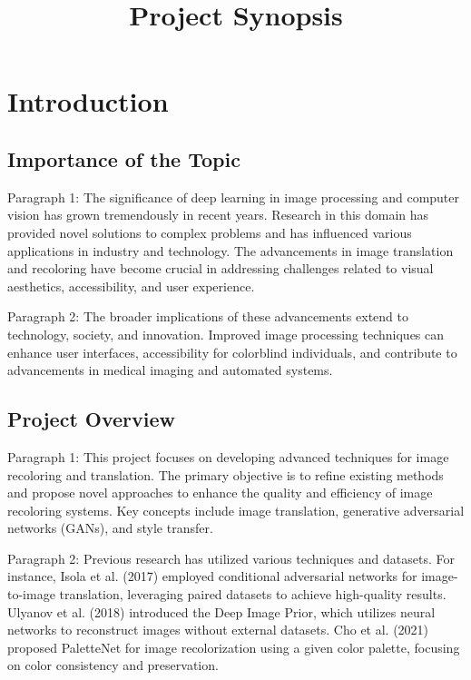 \documentclass{article}
\title{Project Synopsis}
\author{}
\date{}
\begin{document}
\maketitle

\section{Introduction}

\subsection{Importance of the Topic}

Paragraph 1: The significance of deep learning in image processing and computer vision has grown tremendously in recent years. Research in this domain has provided novel solutions to complex problems and has influenced various applications in industry and technology. The advancements in image translation and recoloring have become crucial in addressing challenges related to visual aesthetics, accessibility, and user experience.

Paragraph 2: The broader implications of these advancements extend to technology, society, and innovation. Improved image processing techniques can enhance user interfaces, accessibility for colorblind individuals, and contribute to advancements in medical imaging and automated systems.

\subsection{Project Overview}

Paragraph 1: This project focuses on developing advanced techniques for image recoloring and translation. The primary objective is to refine existing methods and propose novel approaches to enhance the quality and efficiency of image recoloring systems. Key concepts include image translation, generative adversarial networks (GANs), and style transfer.

Paragraph 2: Previous research has utilized various techniques and datasets. For instance, Isola et al. (2017) employed conditional adversarial networks for image-to-image translation, leveraging paired datasets to achieve high-quality results. Ulyanov et al. (2018) introduced the Deep Image Prior, which utilizes neural networks to reconstruct images without external datasets. Cho et al. (2021) proposed PaletteNet for image recolorization using a given color palette, focusing on color consistency and preservation.
\end{document}
